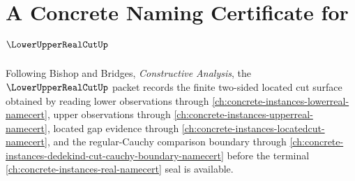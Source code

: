 \chapter{A Concrete Naming Certificate for $\LowerUpperRealCutUp$}
\label{ch:concrete-instances-lower-upper-real-cut-namecert}

Following Bishop and Bridges, \emph{Constructive Analysis}, the $\LowerUpperRealCutUp$ packet records the finite two-sided located cut surface obtained by reading lower observations through \autoref{ch:concrete-instances-lowerreal-namecert}, upper observations through \autoref{ch:concrete-instances-upperreal-namecert}, located gap evidence through \autoref{ch:concrete-instances-locatedcut-namecert}, and the regular-Cauchy comparison boundary through \autoref{ch:concrete-instances-dedekind-cut-cauchy-boundary-namecert} before the terminal \autoref{ch:concrete-instances-real-namecert} seal is available.

